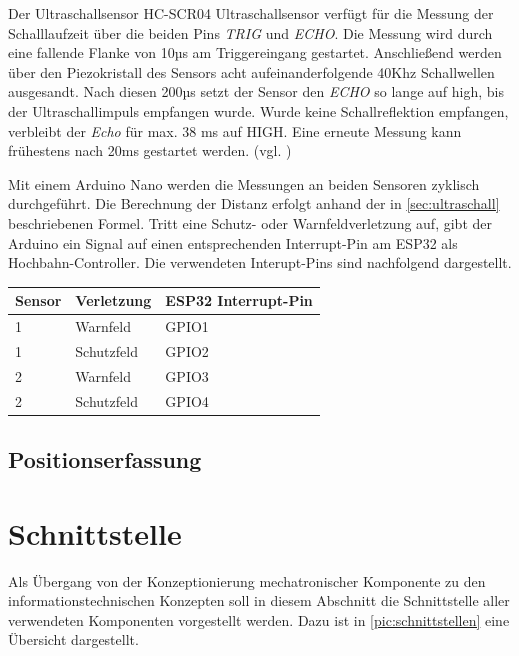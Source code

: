 \newpage
Der Ultraschallsensor HC-SCR04 Ultraschallsensor verfügt für die Messung der Schalllaufzeit über die beiden Pins \textit{TRIG} und \textit{ECHO}. Die Messung wird durch eine fallende Flanke von 10µs am Triggereingang gestartet. Anschließend werden über den  Piezokristall des Sensors acht aufeinanderfolgende 40Khz Schallwellen ausgesandt. Nach diesen 200µs setzt der Sensor den \textit{ECHO} so lange auf high, bis der Ultraschallimpuls empfangen wurde. Wurde keine Schallreflektion empfangen, verbleibt der \textit{Echo} für max. 38 ms auf HIGH. Eine erneute Messung kann frühestens nach 20ms gestartet werden. (vgl. \cite{hcrs04})

Mit einem Arduino Nano werden die Messungen an beiden Sensoren zyklisch durchgeführt. Die Berechnung der Distanz erfolgt anhand der in \autoref{sec:ultraschall} beschriebenen Formel. Tritt eine Schutz- oder Warnfeldverletzung auf, gibt der Arduino ein Signal auf einen entsprechenden Interrupt-Pin am ESP32 als  Hochbahn-Controller. Die verwendeten Interupt-Pins sind nachfolgend dargestellt. \\


\begin{center}
	\begin{tabular}[h]{l|l|l}
		Sensor & Verletzung  & ESP32 Interrupt-Pin \\
		\hline
		1 & Warnfeld & GPIO1\\
		\hline
		1 & Schutzfeld & GPIO2\\
		\hline
		2 & Warnfeld & GPIO3\\
		\hline
		2 & Schutzfeld & GPIO4\\	
	\end{tabular}
\end{center}


\subsection{Positionserfassung}
\newpage
\section{Schnittstelle}
Als Übergang von der Konzeptionierung mechatronischer Komponente zu den informationstechnischen Konzepten soll in diesem Abschnitt die Schnittstelle aller verwendeten Komponenten vorgestellt werden. Dazu ist in \autoref{pic:schnittstellen} eine Übersicht dargestellt.

